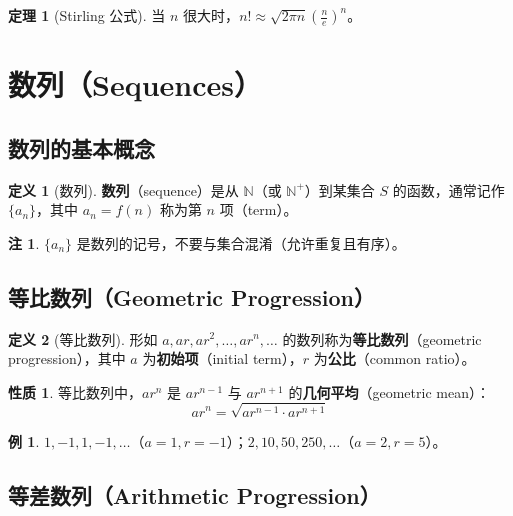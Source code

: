 \documentclass[UTF8,11pt,a4paper]{ctexbook}   %
\theoremstyle{definition}
\newtheorem{definition}{定义}[section]
\newtheorem{theorem}{定理}[section]
\newtheorem{example}{例}[section]
\newtheorem{property}{性质}[section]
\newtheorem{remark}{注}[section]
\begin{document}
\begin{theorem}[Stirling 公式]
当 $n$ 很大时，$n! \approx \sqrt{2\pi n}\left(\frac{n}{e}\right)^n$。
\end{theorem}

\section{数列（Sequences）}

\subsection{数列的基本概念}

\begin{definition}[数列]
\textbf{数列}（sequence）是从 $\mathbb{N}$（或 $\mathbb{N}^+$）到某集合 $S$ 的函数，通常记作 $\{a_n\}$，其中 $a_n = f(n)$ 称为第 $n$ 项（term）。
\end{definition}

\begin{remark}
$\{a_n\}$ 是数列的记号，不要与集合混淆（允许重复且有序）。
\end{remark}

\subsection{等比数列（Geometric Progression）}

\begin{definition}[等比数列]
形如 $a, ar, ar^2, \ldots, ar^n, \ldots$ 的数列称为\textbf{等比数列}（geometric progression），其中 $a$ 为\textbf{初始项}（initial term），$r$ 为\textbf{公比}（common ratio）。
\end{definition}

\begin{property}
等比数列中，$ar^n$ 是 $ar^{n-1}$ 与 $ar^{n+1}$ 的\textbf{几何平均}（geometric mean）：
\[
ar^n = \sqrt{ar^{n-1} \cdot ar^{n+1}}
\]
\end{property}

\begin{example}
$1, -1, 1, -1, \ldots$（$a=1, r=-1$）；$2, 10, 50, 250, \ldots$（$a=2, r=5$）。
\end{example}

\subsection{等差数列（Arithmetic Progression）}
\end{document}
